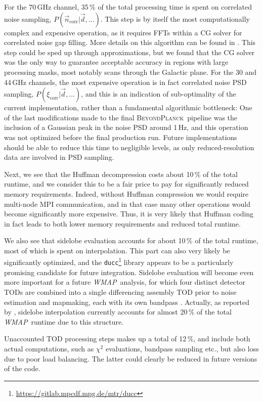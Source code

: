 \documentclass[twocolumn]{aa}
\def\WMAP{\emph{WMAP}}
\renewcommand{\d}[0]{\vec{d}}
\newcommand{\n}[0]{\vec{n}}
\newcommand{\BP}{\textsc{BeyondPlanck}}
\begin{document}
For the 70\,GHz channel, 35\,\% of the total processing time is spent
on correlated noise sampling, $P(\n_{\mathrm{corr}}|\d,\ldots)$. This
step is by itself the most computationally complex and expensive
operation, as it requires FFTs within a CG solver for correlated noise
gap filling. More details on this algorithm can be found in
\citet{BP06}. This step could be sped up through approximations, but
we found that the CG solver was the only way to guarantee acceptable
accuracy in regions with large processing masks, most notably scans
through the Galactic plane. For the 30 and 44\,GHz channels, the most
expensive operation is in fact correlated noise PSD sampling,
$P(\xi_{\mathrm{corr}}|\d,\ldots)$, and this is an indication of
sub-optimality of the current implementation, rather than a
fundamental algorithmic bottleneck: One of the last modifications made
to the final \BP\ pipeline was the inclusion of a Gaussian peak in the
noise PSD around 1\,Hz, and this operation was not optimized before
the final production run. Future implementations should be able to
reduce this time to negligible levels, as only reduced-resolution data
are involved in PSD sampling.

Next, we see that the Huffman decompression costs about 10\,\% of the
total runtime, and we consider this to be a fair price to pay for
significantly reduced memory requirements. Indeed, without Huffman
compression we would require multi-node MPI communication, and in that
case many other operations would become significantly more
expensive. Thus, it is very likely that Huffman coding in fact leads
to both lower memory requirements and reduced total runtime.

We also see that sidelobe evaluation accounts for about 10\,\% of the
total runtime, most of which is spent on interpolation. This part can
also very likely be significantly optimized, and the
\texttt{ducc}\footnote{\url{https://gitlab.mpcdf.mpg.de/mtr/ducc}}
library appears to be a particularly promising candidate for future
integration. Sidelobe evaluation will become even more important for a
future \WMAP\ analysis, for which four distinct detector TODs are
combined into a single differencing assembly TOD prior to noise
estimation and mapmaking, each with its own bandpass
\citep{bennett2012}. Actually, as reported by \citet{BP17}, sidelobe
interpolation currently accounts for almost 20\,\% of the total
\WMAP\ runtime due to this structure.

Unaccounted TOD processing steps makes up a total of 12\,\%, and
include both actual computations, such as $\chi^2$ evaluations,
bandpass sampling etc., but also loss due to poor load balancing. The
latter could clearly be reduced in future versions of the code.
\end{document}
